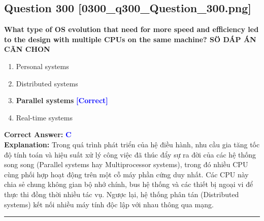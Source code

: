 \documentclass[11pt,a4paper]{article}
\begin{document}
\begin{minipage}{\textwidth}
\subsection*{Question 300 \quad \footnotesize{[0300\_q300\_Question\_300.png]}}
\noindent \textbf{What type of OS evolution that need for more speed and efficiency led to the design with multiple CPUs on the same machine? SÖ DÁP ÁN CÃN CHON}

\begin{enumerate}[label=\Alph*.]
    \item Personal systems
    \item Distributed systems
    \item \textbf{Parallel systems} \hfill \textcolor{blue}{\textbf{[Correct]}}
    \item Real-time systems
\end{enumerate}

\noindent \textbf{Correct Answer:} \textcolor{blue}{\textbf{C}} \\[2pt]
\noindent \textbf{Explanation:} Trong quá trình phát triển của hệ điều hành, nhu cầu gia tăng tốc độ tính toán và hiệu suất xử lý công việc đã thúc đẩy sự ra đời của các hệ thống song song (Parallel systems hay Multiprocessor systems), trong đó nhiều CPU cùng phối hợp hoạt động trên một cỗ máy phần cứng duy nhất. Các CPU này chia sẻ chung không gian bộ nhớ chính, bus hệ thống và các thiết bị ngoại vi để thực thi đồng thời nhiều tác vụ. Ngược lại, hệ thống phân tán (Distributed systems) kết nối nhiều máy tính độc lập với nhau thông qua mạng.

\par\vspace{0.3cm}
\hrule
\vspace{0.3cm}
\end{minipage}
\end{document}
